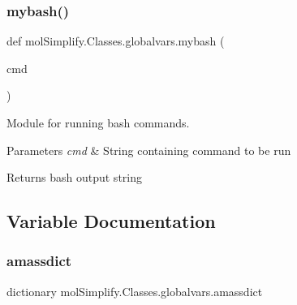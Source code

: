 \subsubsection{\texorpdfstring{mybash()}{mybash()}}
{\footnotesize\ttfamily def mol\+Simplify.\+Classes.\+globalvars.\+mybash (\begin{DoxyParamCaption}\item[{}]{cmd }\end{DoxyParamCaption})}



Module for running bash commands. 


\begin{DoxyParams}{Parameters}
{\em cmd} & String containing command to be run \\
\hline
\end{DoxyParams}
\begin{DoxyReturn}{Returns}
bash output string 
\end{DoxyReturn}


\subsection{Variable Documentation}
\mbox{\label{namespacemolSimplify_1_1Classes_1_1globalvars_aecbcb6a8a3ae644971d886fd42b18f8f}} 
\subsubsection{\texorpdfstring{amassdict}{amassdict}}
{\footnotesize\ttfamily dictionary mol\+Simplify.\+Classes.\+globalvars.\+amassdict}

